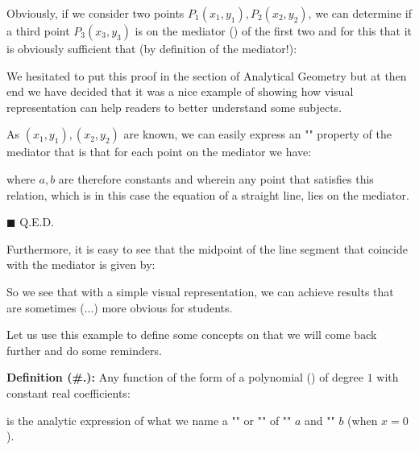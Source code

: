 	\begin{theorem}
	Obviously, if we consider two points $P_1(x_1,y_1),P_2(x_2,y_2)$, we can determine if a third point $P_3(x_3,y_3)$ is on the mediator () of the first two and for this that it is obviously sufficient that (by definition of the mediator!):
	
	\end{theorem}
	\begin{tcolorbox}[title=Remark,arc=10pt,breakable,drop lifted shadow,
  skin=enhanced,
  skin first is subskin of={enhancedfirst}{arc=10pt,no shadow},
  skin middle is subskin of={enhancedmiddle}{arc=10pt,no shadow},
  skin last is subskin of={enhancedlast}{drop lifted shadow}]
	We hesitated to put this proof in the section of Analytical Geometry but at then end we have decided that it was a nice example of showing how visual representation can help readers to better understand some subjects.
	\end{tcolorbox}	
	\begin{dem}
	As $(x_1,y_1),(x_2,y_2)$ are known, we can easily express an "" property of the mediator\label{mediator analytic expression} that is that for each point on the mediator we have:
	
	where $a, b$ are therefore constants and wherein any point that satisfies this relation, which is in this case the equation of a straight line, lies on the mediator.
	\begin{flushright}
		$\blacksquare$  Q.E.D.
	\end{flushright}
	\end{dem}
	Furthermore, it is easy to see that the midpoint of the line segment that coincide with the mediator is given by:
	
	So we see that with a simple visual representation, we can achieve results that are sometimes (...) more obvious for students.
	
	Let us use this example to define some concepts on that we will come back further and do some reminders.
	
	\textbf{Definition (\#\thesection.\mydef):} Any function of the form of a polynomial () of degree $1$ with constant real coefficients:
	
	is the analytic expression of what we name a "\label{straight line}" or "" of "" $a$ and "" $b$ (when $x=0$).
	

